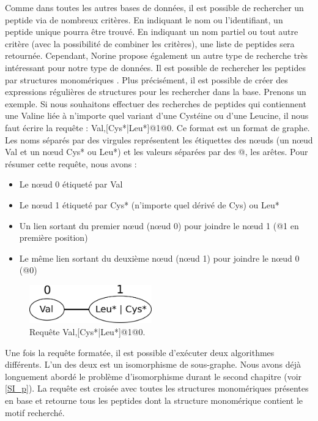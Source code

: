 Comme dans toutes les autres bases de données, il est possible de rechercher un peptide via de nombreux critères.
En indiquant le nom ou l'identifiant, un peptide unique pourra être trouvé.
En indiquant un nom partiel ou tout autre critère (avec la possibilité de combiner les critères), une liste de peptides sera retournée.
Cependant, Norine propose également un autre type de recherche très intéressant pour notre type de données.
Il est possible de rechercher les peptides par structures monomériques \cite{caboche_structural_2009}.
Plus précisément, il est possible de créer des expressions régulières de structures pour les rechercher dans la base.
Prenons un exemple.
Si nous souhaitons effectuer des recherches de peptides qui contiennent une Valine liée à n'importe quel variant d'une Cystéine ou d'une Leucine, il nous faut écrire la requête : Val,[Cys*|Leu*]@1@0.
Ce format est un format de graphe.
Les noms séparés par des virgules représentent les étiquettes des n\oe{}uds (un n\oe{}ud Val et un n\oe{}ud Cys* ou Leu*) et les valeurs séparées par des @, les arêtes.
Pour résumer cette requête, nous avons :
\begin{itemize}
 \item Le n\oe{}ud 0 étiqueté par Val
 \item Le n\oe{}ud 1 étiqueté par Cys* (n'importe quel dérivé de Cys) ou Leu*
 \item Un lien sortant du premier n\oe{}ud (n\oe{}ud 0) pour joindre le n\oe{}ud 1 (@1 en première position)
 \item Le même lien sortant du deuxième n\oe{}ud (n\oe{}ud 1) pour joindre le n\oe{}ud 0 (@0)
\end{itemize}

\begin{figure}[h!]
  \begin{center}
    \includegraphics[width=200px]{Figures/Norine/requete.png}
    \caption{\label{requete}Requête Val,[Cys*|Leu*]@1@0.}
  \end{center}
\end{figure}

Une fois la requête formatée, il est possible d'exécuter deux algorithmes différents.
L'un des deux est un isomorphisme de sous-graphe.
Nous avons déjà longuement abordé le problème d'isomorphisme durant le second chapitre (voir \ref{SI_p}).
La requête est croisée avec toutes les structures monomériques présentes en base et retourne tous les peptides dont la structure monomérique contient le motif recherché.

